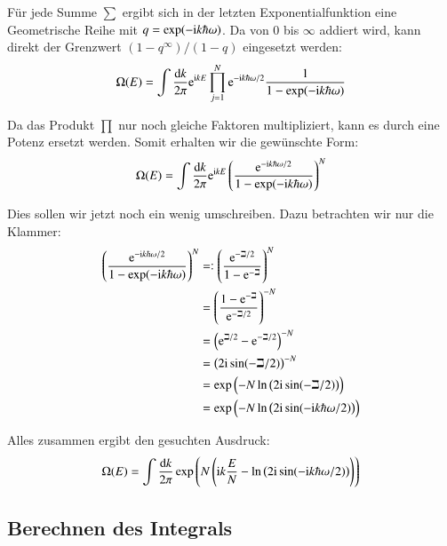 Für jede Summe $\sum$ ergibt sich in der letzten Exponentialfunktion eine Geometrische Reihe mit $q = \exp( - \mathrm i k \hbar\omega)$. Da von 0 bis $\infty$ addiert wird, kann direkt der Grenzwert $(1 - q^\infty)/(1-q)$ eingesetzt werden:
\[
    \Omega(E) =
    \int \frac{\dif k}{2 \pi}
    \eup^{\iup k E}
    \prod_{j=1}^N
    \eup^{-\iup k \hbar\omega /2}
    \frac1{1 - \exp( - \iup k \hbar\omega)}
\]

Da das Produkt $\prod$ nur noch gleiche Faktoren multipliziert, kann es durch
eine Potenz ersetzt werden. Somit erhalten wir die gewünschte Form:
\[
    \Omega(E) =
    \int \frac{\dif k}{2 \pi}
    \eup^{\iup k E}
    \del{ \frac{\eup^{-\iup k \hbar\omega /2}}{1 - \exp( - \iup k \hbar\omega)} }^N
\]

Dies sollen wir jetzt noch ein wenig umschreiben. Dazu betrachten wir nur die Klammer:
\begin{align*}
    \del{ \frac{\eup^{-\iup k \hbar\omega /2}}{1 - \exp( - \iup k \hbar\omega)} }^N
    &=: \del{\frac{\eup^{-\beth/2}}{1 - \eup^{-\beth}}}^N \\
    &= \del{\frac{1 - \eup^{-\beth}}{\eup^{-\beth/2}}}^{-N} \\
    &= \del{\eup^{\beth/2} - \eup^{-\beth/2}}^{-N} \\
    &= \del{2\iup \sin(-\beth/2)}^{-N} \\
    &= \exp\del{-N \ln\del{2\iup \sin(-\beth/2)}} \\
    &= \exp\del{-N \ln\del{2\iup \sin(-\iup k \hbar\omega/2)}}
\end{align*}

Alles zusammen ergibt den gesuchten Ausdruck:
\[
    \Omega(E) =
    \int \frac{\dif k}{2 \pi}
    \exp\del{N \del{ \iup k \frac EN - \ln\del{2\iup \sin(-\iup k \hbar\omega/2)} }}
\]

\subsection{Berechnen des Integrals}

\printbibliography


